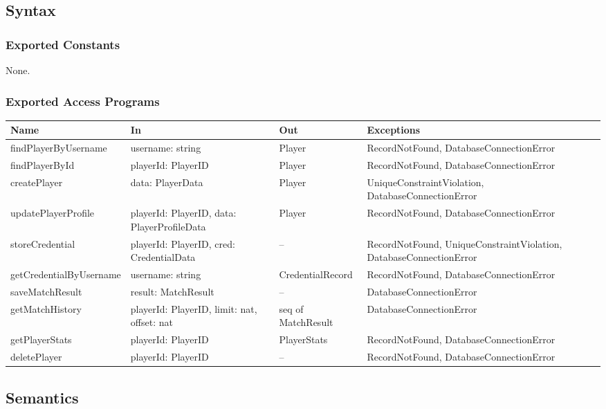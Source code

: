 \documentclass[12pt, titlepage]{article}
\begin{document}
\subsection{Syntax}

\subsubsection{Exported Constants}
None.

\subsubsection{Exported Access Programs}

\begin{center}
\begin{tabular}{p{4.5cm} p{4.5cm} p{3.5cm} p{3.5cm}}
\toprule
\textbf{Name} & \textbf{In} & \textbf{Out} & \textbf{Exceptions} \\
\midrule
findPlayerByUsername & username: string & Player & RecordNotFound, DatabaseConnectionError \\
findPlayerById & playerId: PlayerID & Player & RecordNotFound, DatabaseConnectionError \\
createPlayer & data: PlayerData & Player & UniqueConstraintViolation, DatabaseConnectionError \\
updatePlayerProfile & playerId: PlayerID, data: PlayerProfileData & Player & RecordNotFound, DatabaseConnectionError \\
storeCredential & playerId: PlayerID, cred: CredentialData & -- & RecordNotFound, UniqueConstraintViolation, DatabaseConnectionError \\
getCredentialByUsername & username: string & CredentialRecord & RecordNotFound, DatabaseConnectionError \\
saveMatchResult & result: MatchResult & -- & DatabaseConnectionError \\
getMatchHistory & playerId: PlayerID, limit: nat, offset: nat & seq of MatchResult & DatabaseConnectionError \\
getPlayerStats & playerId: PlayerID & PlayerStats & RecordNotFound, DatabaseConnectionError \\
deletePlayer & playerId: PlayerID & -- & RecordNotFound, DatabaseConnectionError \\
\bottomrule
\end{tabular}
\end{center}

\subsection{Semantics}
\end{document}
